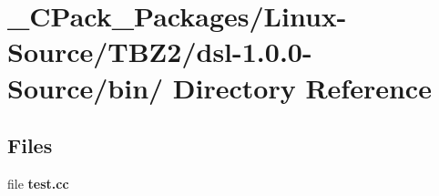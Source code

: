 \section{\_\-CPack\_\-Packages/Linux-\/Source/TBZ2/dsl-\/1.0.0-\/Source/bin/ Directory Reference}
\label{dir_db3ce3980f01be04fa1b7c87ec7a8a07}
\subsection*{Files}
\begin{DoxyCompactItemize}
\item 
file {\bf test.cc}
\end{DoxyCompactItemize}
